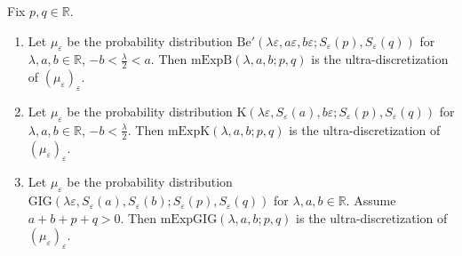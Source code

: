 \documentclass[10pt,a4paper]{amsart}
\def\R{\mathbb{R}}
\def\e{\varepsilon}
\newcommand{\la}{\lambda}
\begin{document}
\begin{Theorem}\label{thm:trop-dist}
Fix $p,q \in \mathbb R$.
\begin{enumerate}
\item[$(i)$] Let $\mu_{\e}$ be the probability distribution $\mathrm{Be}'(\la \e, a\e ,b \e; S_{\e}(p), S_{\e}(q))$ for $\lambda, a,b \in \R$, ${-b\! <\! \frac{\lambda}{2}\! <\! a}$. Then $\mathrm{mExpB}(\la , a,b ; p, q)$ is the ultra-discretization of $(\mu_{\e})_{\e}$.

\item[$(ii)$] Let $\mu_{\e}$ be the probability distribution $\mathrm{K}(\la \e, S_{\e}(a) ,b \e; S_{\e}(p), S_{\e}(q))$ for $\lambda,a,b \in \R$, $-b < \frac{\lambda}{2}$. Then $\mathrm{mExpK}(\la , a,b ; p, q)$ is the ultra-discretization of $(\mu_{\e})_{\e}$.

\item[$(iii)$] Let $\mu_{\e}$ be the probability distribution $\mathrm{GIG}(\la \e, S_{\e}(a) ,S_{\e}(b); S_{\e}(p), S_{\e}(q))$ for $\lambda,a,b \in \R$. Assume $a+b+p+q>0$. Then $\mathrm{mExpGIG} (\lambda,a,b ; p, q)$ is the ultra-discretization of $(\mu_{\e})_{\e}$.
\end{enumerate}
\end{Theorem}
\end{document}
